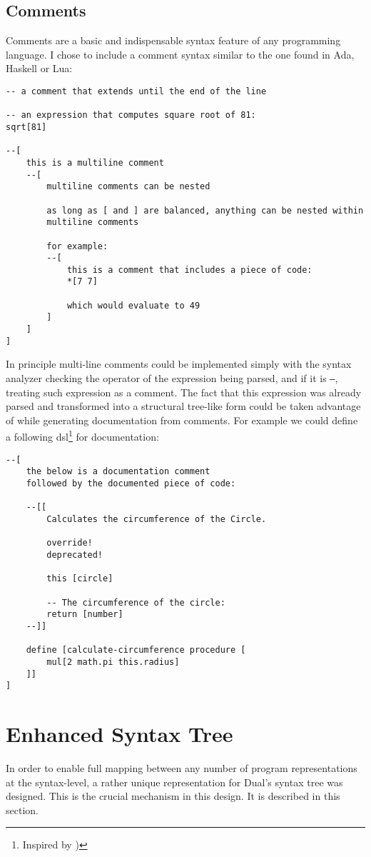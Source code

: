 \subsection{Comments}\label{sub:comments}
Comments are a basic and indispensable syntax feature of any programming language. I chose to include a comment syntax similar to the one found in Ada, Haskell or Lua:
\begin{lstlisting}
-- a comment that extends until the end of the line

-- an expression that computes square root of 81:
sqrt[81]

--[
    this is a multiline comment
    --[
        multiline comments can be nested
    
        as long as [ and ] are balanced, anything can be nested within
        multiline comments
        
        for example:
        --[
            this is a comment that includes a piece of code:
            *[7 7]
            
            which would evaluate to 49
        ]
    ]
]
\end{lstlisting}

In principle multi-line comments could be implemented simply with the syntax
analyzer checking the operator of the expression being parsed, and if it is
\texttt{--}, treating such expression as a comment. The fact that this
expression was already parsed and transformed into a structural tree-like form
could be taken advantage of while generating documentation from comments. For
example we could define a following \acrlong{dsl}\footnote{Inspired by \cite{jsdoc_wikipedia})} for documentation:
\begin{lstlisting}
--[
    the below is a documentation comment
    followed by the documented piece of code:
    
    --[[
        Calculates the circumference of the Circle.
        
        override!
        deprecated!
        
        this [circle]
        
        -- The circumference of the circle: 
        return [number]
    --]]
    
    define [calculate-circumference procedure [
        mul[2 math.pi this.radius]
    ]]
]
\end{lstlisting}

\section{Enhanced Syntax Tree}
In order to enable full mapping between any number of program representations at the syntax-level, a rather unique representation for Dual's syntax tree was designed. This is the crucial mechanism in this design. It is described in this section.


